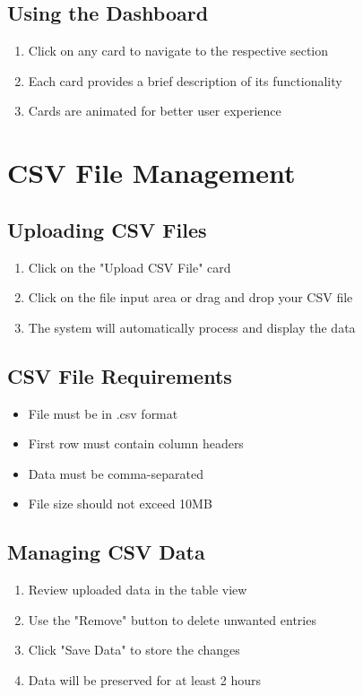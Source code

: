\documentclass[12pt,a4paper]{article}
\begin{document}
\subsection{Using the Dashboard}
\begin{enumerate}
    \item Click on any card to navigate to the respective section
    \item Each card provides a brief description of its functionality
    \item Cards are animated for better user experience
\end{enumerate}

\section{CSV File Management}
\subsection{Uploading CSV Files}
\begin{enumerate}
    \item Click on the "Upload CSV File" card
    \item Click on the file input area or drag and drop your CSV file
    \item The system will automatically process and display the data
\end{enumerate}

\subsection{CSV File Requirements}
\begin{itemize}
    \item File must be in .csv format
    \item First row must contain column headers
    \item Data must be comma-separated
    \item File size should not exceed 10MB
\end{itemize}

\subsection{Managing CSV Data}
\begin{enumerate}
    \item Review uploaded data in the table view
    \item Use the "Remove" button to delete unwanted entries
    \item Click "Save Data" to store the changes
    \item Data will be preserved for at least 2 hours
\end{enumerate}
\end{document}
